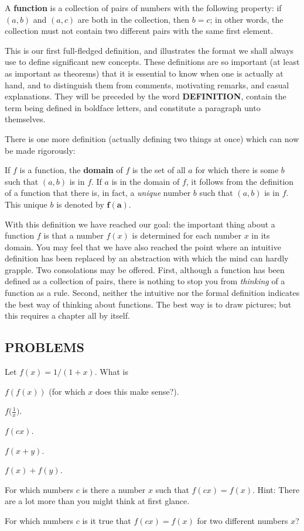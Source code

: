 \begin{spivakdefn}
A \textbf{function} is a collection of pairs of numbers with the following
property: if $(a,b)$ and $(a,c)$ are both in the collection, then $b=c$; in
other words, the collection must not contain two different pairs with the same
first element.
\end{spivakdefn}

This is our first full-fledged definition, and illustrates the format we shall
always use to define significant new concepts. These definitions are so
important (at least as important as theorems) that it is essential to know
when one is actually at hand, and to distinguish them from comments,
motivating remarks, and casual explanations. They will be preceded by the
word \textbf{DEFINITION}, contain the term being defined in boldface letters,
and constitute a paragraph unto themselves.

There is one more definition (actually defining two things at once) which can
now be made rigorously:

\begin{spivakdefn}
If $f$ is a function, the \textbf{domain} of $f$ is the set of all $a$ for
which there is some $b$ such that $(a,b)$ is in $f$. If $a$ is in the domain
of $f$, it follows from the definition of a function that there is, in fact, a
\emph{unique} number $b$ such that $(a,b)$ is in $f$. This unique $b$ is
denoted by $\boldsymbol{f(a)}$.
\end{spivakdefn}

With this definition we have reached our goal: the important thing about a
function $f$ is that a number $f(x)$ is determined for each number $x$ in its
domain. You may feel that we have also reached the point where an intuitive
definition has been replaced by an abstraction with which the mind can hardly
grapple. Two consolations may be offered. First, although a function has been
defined as a collection of pairs, there is nothing to stop you from
\emph{thinking} of a function as a rule. Second, neither the intuitive nor the
formal definition indicates the best way of thinking about functions. The best
way is to draw pictures; but this requires a chapter all by itself.

\subsection*{PROBLEMS}

 Let $f(x) = 1/(1+x)$. What is
\begin{romans}
\item $f(f(x))$ (for which $x$ does this make sense?).
\item $\displaystyle f\Biggl(\frac{1}{x}\Biggr)$.
\item $f(cx)$.
\item $f(x+y)$.
\item $f(x)+f(y)$.
\item For which numbers $c$ is there a number $x$ such that $f(cx)=f(x)$.
Hint: There are a lot more than you might think at first glance.
\item For which numbers $c$ is it true that $f(cx)=f(x)$ for two different
numbers $x$?
\end{romans}

